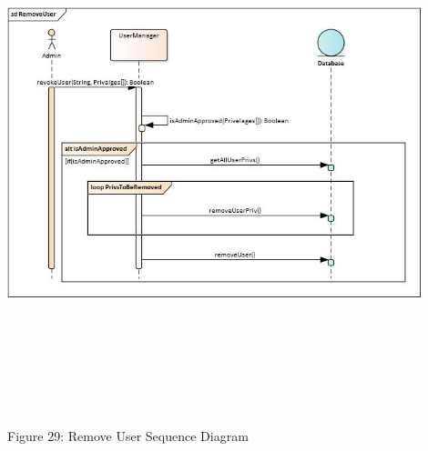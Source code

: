     \includegraphics[width=12cm,height=15cm,keepaspectratio]{admin_ui/images/sequence_diagrams/RemoveUser.jpg}
		\begin{center}
	    \small{Figure 29: Remove User Sequence Diagram}
    \end{center}




